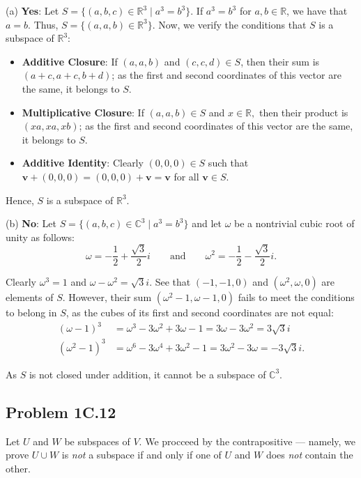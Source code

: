 \documentclass[11pt]{article}
\renewcommand{\vec}[1]{\mathbf{#1}}
\begin{document}
(a) \textbf{Yes}: Let $S = \{ (a, b, c) \in \mathbb{R}^{3} \mid a^{3} = b^{3} \}$. If $a^{3} = b^{3}$ for $a, b \in \mathbb{R}$, we have that $a = b$. Thus, $S = \{ (a, a, b) \in \mathbb{R}^{3} \}$. Now, we verify the conditions that $S$ is a subspace of $\mathbb{R}^{3}$:
\begin{itemize}
	\item \textbf{Additive Closure}: If $(a, a, b)$ and $(c, c, d) \in S$, then their sum is $(a + c, a + c, b + d)$; as the first and second coordinates of this vector are the same, it belongs to $S$. 
	\item \textbf{Multiplicative Closure}: If $(a, a, b) \in S$ and $x \in \mathbb{R},$ then their product is $(xa, xa, xb)$; as the first and second coordinates of this vector are the same, it belongs to $S$.
	\item \textbf{Additive Identity}: Clearly $(0, 0, 0) \in S$ such that $\vec{v} + (0, 0, 0) = (0, 0, 0) + \vec{v} = \vec{v}$ for all $\vec{v} \in S$.
\end{itemize}
Hence, $S$ is a subspace of $\mathbb{R}^{3}$.

(b) \textbf{No}: Let $S = \{ (a, b, c) \in \mathbb{C}^{3} \mid a^{3} = b^{3} \}$ and let $\omega$ be a nontrivial cubic root of unity as follows: 
\[
	\omega = -\frac{1}{2} + \frac{\sqrt{3}}{2} i \qquad \text{and} \qquad \omega^{2} = -\frac{1}{2} -\frac{\sqrt{3}}{2} i.
\]

Clearly $\omega^{3} = 1$ and $\omega - \omega^{2} = \sqrt{3} i$. See that $(-1, -1, 0)$ and $(\omega^{2}, \omega, 0)$ are elements of $S$. However, their sum $(\omega^{2} - 1, \omega - 1, 0)$ fails to meet the conditions to belong in $S$, as the cubes of its first and second coordinates are not equal:
\begin{align*}
	(\omega - 1)^{3} &= \omega^{3} - 3 \omega^{2} + 3 \omega - 1 = 3 \omega - 3 \omega^{2} = 3 \sqrt{3} i \\ 
	(\omega^{2} - 1)^{3} &= \omega^{6} - 3 \omega^{4} + 3 \omega^{2} - 1 = 3 \omega^{2} - 3 \omega = -3 \sqrt{3} i.
\end{align*}

As $S$ is not closed under addition, it cannot be a subspace of $\mathbb{C}^{3}$.

\subsection{Problem 1C.12}

Let $U$ and $W$ be subspaces of $V$. We procceed by the contrapositive --- namely, we prove $U \cup W$ is \textit{not} a subspace if and only if one of $U$ and $W$ does \textit{not} contain the other.
\end{document}
